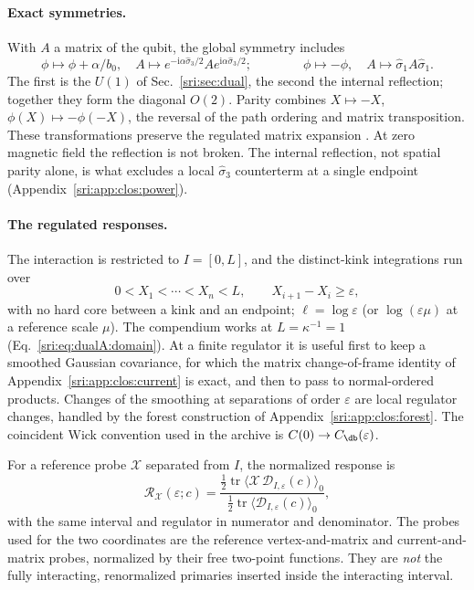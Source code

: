 \paragraph{Exact symmetries.} With $A$ a matrix of the qubit, the global symmetry includes
\begin{equation}
 \phi\mapsto\phi+\alpha/b_0,\quad A\mapsto e^{-\mathrm i\alpha\hat\sigma_3/2}Ae^{\mathrm i\alpha\hat\sigma_3/2};
 \qquad\qquad
 \phi\mapsto-\phi,\quad A\mapsto\hat\sigma_1A\hat\sigma_1.
 \label{sri:eq:clos:symmetry}
\end{equation}
The first is the $U(1)$ of Sec.~\ref{sri:sec:dual}, the second the internal reflection; together they form the diagonal
$O(2)$. Parity combines $X\mapsto-X$, $\phi(X)\mapsto-\phi(-X)$, the reversal of the path ordering and matrix
transposition. These transformations preserve the regulated matrix expansion
\cite[Eqs.~(3.31)--(3.35)]{sri:Benedetti:2025nzp}. At zero magnetic field the reflection is not broken. The internal
reflection, not spatial parity alone, is what excludes a local $\hat\sigma_3$ counterterm at a single endpoint
(Appendix~\ref{sri:app:clos:power}).

\paragraph{The regulated responses.} The interaction is restricted to $I=[0,L]$, and the distinct-kink integrations
run over
\begin{equation}
 0<X_1<\cdots<X_n<L,\qquad X_{i+1}-X_i\ge\varepsilon,
 \label{sri:eq:clos:cutoff}
\end{equation}
with no hard core between a kink and an endpoint; $\ell=\log\varepsilon$ (or $\log(\varepsilon\mu)$ at a reference
scale $\mu$). The compendium works at $L=\kappa^{-1}=1$ (Eq.~\eqref{sri:eq:dualA:domain}). At a finite regulator it
is useful first to keep a smoothed Gaussian covariance, for which the matrix change-of-frame identity of
Appendix~\ref{sri:app:clos:current} is exact, and then to pass to normal-ordered products. Changes of the smoothing at
separations of order $\varepsilon$ are local regulator changes, handled by the forest construction of
Appendix~\ref{sri:app:clos:forest}. The coincident Wick convention used in the archive is $C(0)\to C_{\db}(\varepsilon)$.

For a reference probe $\mathcal X$ separated from $I$, the normalized response is
\begin{equation}
 \mathcal R_{\mathcal X}(\varepsilon;c)
 =\frac{\frac12\operatorname{tr}\langle\mathcal X\,\mathcal D_{I,\varepsilon}(c)\rangle_0}
 {\frac12\operatorname{tr}\langle\mathcal D_{I,\varepsilon}(c)\rangle_0},
 \label{sri:eq:clos:ratio}
\end{equation}
with the same interval and regulator in numerator and denominator. The probes used for the two coordinates are the
reference vertex-and-matrix and current-and-matrix probes, normalized by their free two-point functions. They are
\emph{not} the fully interacting, renormalized primaries inserted inside the interacting interval.

